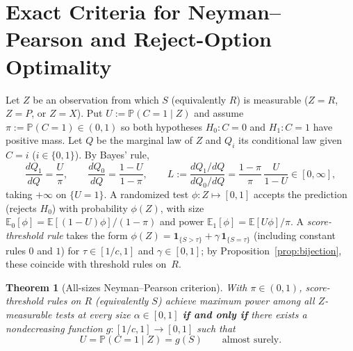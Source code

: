 \documentclass[11pt]{article}
\theoremstyle{plain}
\newtheorem{theorem}{Theorem}
\theoremstyle{definition}
\theoremstyle{remark}
\begin{document}
\section{Exact Criteria for Neyman--Pearson and Reject-Option Optimality}

Let $Z$ be an observation from which $S$ (equivalently $R$) is measurable ($Z = R$, $Z = P$, or $Z = X$). Put $U := \mathbb{P}(C = 1 \mid Z)$ and assume $\pi := \mathbb{P}(C = 1) \in (0, 1)$ so both hypotheses $H_0 : C = 0$ and $H_1 : C = 1$ have positive mass. Let $Q$ be the marginal law of $Z$ and $Q_i$ its conditional law given $C = i$ ($i \in \{0, 1\}$). By Bayes' rule,
\[
\frac{dQ_1}{dQ} = \frac{U}{\pi}, \qquad
\frac{dQ_0}{dQ} = \frac{1 - U}{1 - \pi}, \qquad
L := \frac{dQ_1 / dQ}{dQ_0 / dQ} = \frac{1 - \pi}{\pi}\,\frac{U}{1 - U} \in [0, \infty],
\]
taking $+\infty$ on $\{U = 1\}$. A randomized test $\phi : Z \mapsto [0, 1]$ accepts the prediction (rejects $H_0$) with probability $\phi(Z)$, with size $\mathbb{E}_0[\phi] = \mathbb{E}[(1 - U)\phi]/(1 - \pi)$ and power $\mathbb{E}_1[\phi] = \mathbb{E}[U\phi]/\pi$. A \emph{score-threshold rule} takes the form $\phi(Z) = \mathbf{1}_{\{S > \tau\}} + \gamma\,\mathbf{1}_{\{S = \tau\}}$ (including constant rules $0$ and $1$) for $\tau \in [1/c, 1]$ and $\gamma \in [0, 1]$; by Proposition~\ref{prop:bijection}, these coincide with threshold rules on~$R$.

\begin{theorem}[All-sizes Neyman--Pearson criterion]\label{thm:np-iff}
With $\pi \in (0, 1)$, score-threshold rules on $R$ (equivalently $S$) achieve maximum power among all $Z$-measurable tests at every size $\alpha \in [0, 1]$ \textbf{if and only if} there exists a nondecreasing function $g : [1/c, 1] \to [0, 1]$ such that
\begin{equation}\label{eq:monotone-post}
U = \mathbb{P}(C = 1 \mid Z) = g(S) \qquad \text{almost surely.}
\end{equation}
\end{theorem}
\end{document}
